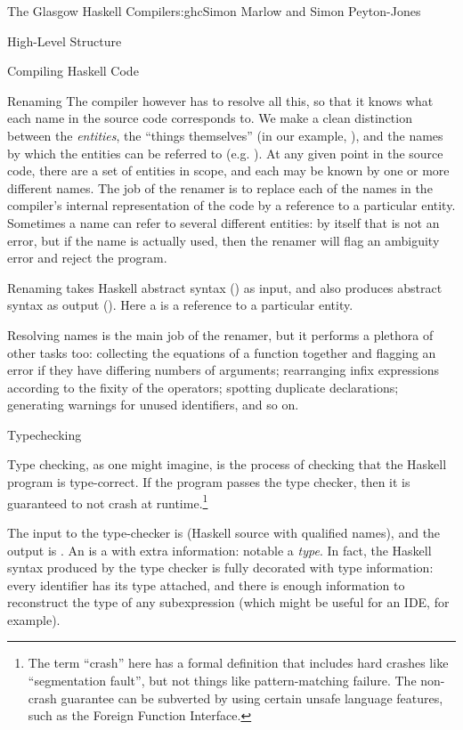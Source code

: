 \begin{aosachapter}{The Glasgow Haskell Compiler}{s:ghc}{Simon Marlow and Simon Peyton-Jones}
\begin{aosasect1}{High-Level Structure}
\begin{aosasect2}{Compiling Haskell Code}
\begin{aosasect3}{Renaming}
The compiler however has to resolve all this, so that it knows what
each name in the source code corresponds to.  We make a clean
distinction between the \emph{entities}, the ``things themselves'' (in
our example, ), and the names by which the entities can be
referred to (e.g. ).  At any given point in the source code,
there are a set of entities in scope, and each may be known by one or
more different names.  The job of the renamer is to replace each of
the names in the compiler's internal representation of the code by a
reference to a particular entity.  Sometimes a name can refer to
several different entities: by itself that is not an error, but if the
name is actually used, then the renamer will flag an ambiguity error
and reject the program.

Renaming takes Haskell abstract syntax () as
input, and also produces abstract syntax as output ().  Here a  is a reference to a particular entity.

Resolving names is the main job of the renamer, but it performs a
plethora of other tasks too: collecting the equations of a function
together and flagging an error if they have differing numbers of
arguments; rearranging infix expressions according to the fixity of
the operators; spotting duplicate declarations; generating warnings
for unused identifiers, and so on.

\end{aosasect3}

\begin{aosasect3}{Typechecking}

Type checking, as one might imagine, is the process of checking that
the Haskell program is type-correct.  If the program passes the type
checker, then it is guaranteed to not crash at runtime.\footnote{The
  term ``crash'' here has a formal definition that includes hard
  crashes like ``segmentation fault'', but not things like
  pattern-matching failure.  The non-crash guarantee can be subverted
  by using certain unsafe language features, such as the Foreign
  Function Interface.}

The input to the type-checker is  (Haskell source
with qualified names), and the output is .  An
 is a  with extra information: notable a
\emph{type}.  In fact, the Haskell syntax produced by the type checker
is fully decorated with type information: every identifier has its
type attached, and there is enough information to reconstruct the type
of any subexpression (which might be useful for an IDE, for example).


\end{aosasect3}
\end{aosasect2}
\end{aosasect1}
\end{aosachapter}
